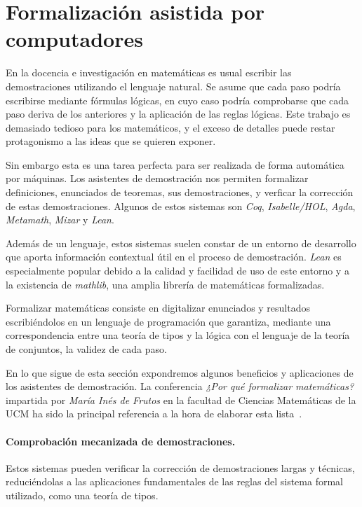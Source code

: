 \section{Formalización asistida por computadores}

En la docencia e investigación en matemáticas es usual escribir las
demostraciones utilizando el lenguaje natural. Se asume que cada paso podría
escribirse mediante fórmulas lógicas, en cuyo caso podría comprobarse que cada
paso deriva de los anteriores y la aplicación de las reglas lógicas. Este
trabajo es demasiado tedioso para los matemáticos, y el exceso
de detalles puede restar protagonismo a las ideas que se quieren exponer.

Sin embargo esta es una tarea perfecta para ser realizada de forma automática
por máquinas. Los asistentes de demostración nos permiten formalizar
definiciones, enunciados de teoremas, sus demostraciones, y verficar la
corrección de estas demostraciones. Algunos de estos sistemas son \textit{Coq},
\textit{Isabelle/HOL},  \textit{Agda}, \textit{Metamath}, \textit{Mizar} y
\textit{Lean}.

Además de un lenguaje, estos sistemas suelen constar de un entorno de desarrollo
que aporta información contextual útil en el proceso de demostración.
\textit{Lean} es especialmente popular debido a la calidad y facilidad de uso de
este entorno y a la existencia de \textit{mathlib}, una amplia librería de
matemáticas formalizadas.

Formalizar matemáticas consiste en digitalizar enunciados y resultados
escribiéndolos en un lenguaje de programación que garantiza, mediante una
correspondencia entre una teoría de tipos y la lógica con el lenguaje de la
teoría de conjuntos, la validez de cada paso. 

En lo que sigue de esta sección expondremos algunos beneficios y aplicaciones
de los asistentes de demostración. La conferencia \textit{¿Por qué formalizar
	matemáticas?} impartida por \textit{María Inés de Frutos} en la facultad de
Ciencias Matemáticas de la UCM ha sido la principal referencia a la hora de
elaborar esta lista~\cite{defrutosPorQueFormalizar2023a}.

\paragraph{Comprobación mecanizada de demostraciones.}

Estos sistemas pueden verificar la corrección de demostraciones largas y
técnicas, reduciéndolas a las aplicaciones fundamentales de las reglas del
sistema formal utilizado, como una teoría de tipos.

